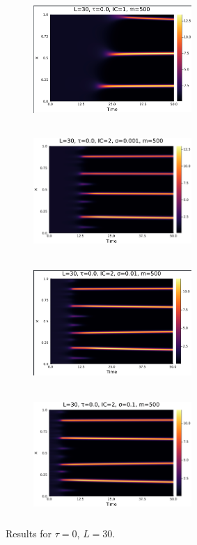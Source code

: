 \documentclass[12pt,a4paper]{article}
\begin{document}
\begin{figure}[H]
    \centering
    \begin{subfigure}[b]{0.45\linewidth}
        \centering
        \includegraphics[width=6cm,height = 4.5cm]{l30t0ic1.png}
        \caption{}
        \label{}
    \end{subfigure}
    \hfill
    \begin{subfigure}[b]{0.45\linewidth}
        \centering
        \includegraphics[width=6cm,height = 4.5cm]{l30t0ic2s1e3.png}
        \caption{}
        \label{}
    \end{subfigure}
    \hfill
    \begin{subfigure}[b]{0.45\linewidth}
        \centering
        \includegraphics[width=6cm,height = 4.5cm]{l30t0ic2s1e2.png}
        \caption{}
        \label{}
    \end{subfigure}
    \hfill
    \begin{subfigure}[b]{0.45\linewidth}
        \centering
        \includegraphics[width=6cm,height = 4.5cm]{l30t0ic2s1e1.png}
        \caption{}
        \label{}
    \end{subfigure}
    \caption{Results for $\tau=0$, $L=30$.}
    \label{}
\end{figure}
\end{document}
